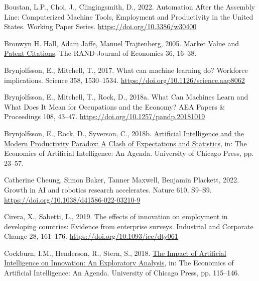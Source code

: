 \documentclass[
  12pt,
  a4paperpaper,
]{article}
\newlength{\cslhangindent}
\newenvironment{CSLReferences}[2] %
 {\begin{list}{}{%
  \setlength{\itemindent}{0pt}
  \setlength{\leftmargin}{0pt}
  \setlength{\parsep}{0pt}
  \ifodd #1
   \setlength{\leftmargin}{\cslhangindent}
   \setlength{\itemindent}{-1\cslhangindent}
  \fi
  \setlength{\itemsep}{#2\baselineskip}}}
 {\end{list}}
\begin{document}
\begin{CSLReferences}{1}{0}
Boustan, L.P., Choi, J., Clingingsmith, D., 2022. Automation {After} the
{Assembly} {Line}: {Computerized} {Machine} {Tools}, {Employment} and
{Productivity} in the {United} {States}. Working {Paper} {Series}.
\url{https://doi.org/10.3386/w30400}

Bronwyn H. Hall, Adam Jaffe, Manuel Trajtenberg, 2005.
\href{https://www.jstor.org/stable/1593752}{Market {Value} and {Patent}
{Citations}}. The RAND Journal of Economics 36, 16--38.

Brynjolfsson, E., Mitchell, T., 2017. What can machine learning do?
{Workforce} implications. Science 358, 1530--1534.
\url{https://doi.org/10.1126/science.aap8062}

Brynjolfsson, E., Mitchell, T., Rock, D., 2018a. What {Can} {Machines}
{Learn} and {What} {Does} {It} {Mean} for {Occupations} and the
{Economy}? AEA Papers \& Proceedings 108, 43--47.
\url{https://doi.org/10.1257/pandp.20181019}

Brynjolfsson, E., Rock, D., Syverson, C., 2018b.
\href{https://www.nber.org/books-and-chapters/economics-artificial-intelligence-agenda/artificial-intelligence-and-modern-productivity-paradox-clash-expectations-and-statistics}{Artificial
{Intelligence} and the {Modern} {Productivity} {Paradox}: {A} {Clash} of
{Expectations} and {Statistics}}, in: The {Economics} of {Artificial}
{Intelligence}: {An} {Agenda}. University of Chicago Press, pp. 23--57.

Catherine Cheung, Simon Baker, Tanner Maxwell, Benjamin Plackett, 2022.
Growth in {AI} and robotics research accelerates. Nature 610, S9--S9.
\url{https://doi.org/10.1038/d41586-022-03210-9}

Cirera, X., Sabetti, L., 2019. The effects of innovation on employment
in developing countries: Evidence from enterprise surveys. Industrial
and Corporate Change 28, 161--176.
\url{https://doi.org/10.1093/icc/dty061}

Cockburn, I.M., Henderson, R., Stern, S., 2018.
\href{https://www.nber.org/books-and-chapters/economics-artificial-intelligence-agenda/impact-artificial-intelligence-innovation-exploratory-analysis}{The
{Impact} of {Artificial} {Intelligence} on {Innovation}: {An}
{Exploratory} {Analysis}}, in: The {Economics} of {Artificial}
{Intelligence}: {An} {Agenda}. University of Chicago Press, pp.
115--146.


\end{CSLReferences}
\end{document}
